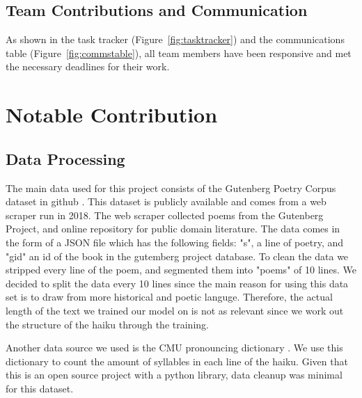 \documentclass{article} %
\begin{document}
\subsection{Team Contributions and Communication}

As shown in the task tracker (Figure~\ref{fig:tasktracker}) and the communications table (Figure~\ref{fig:commstable}), all team members have been responsive and met the necessary deadlines for their work.



\section{Notable Contribution}

\subsection{Data Processing}
The main data used for this project consists of the Gutenberg Poetry Corpus dataset in
github \citep{gutenberg_dataset}.
This dataset is publicly available and comes from a web scraper run in 2018.
The web scraper collected poems from the Gutenberg Project, and online repository for public domain literature.
The data comes in the form of a JSON file which has the following fields:
"s", a line of poetry, and "gid" an id of the book in the gutemberg project database.
To clean the data we stripped every line of the poem, and segmented them into "poems" of 10 lines.
We decided to split the data every 10 lines since the main reason for using this data set is to draw from more historical and poetic languge.
Therefore, the actual length of the text we trained our model on is not as relevant since we work out the structure of the haiku through the training.

Another data source we used is the CMU pronouncing dictionary \citep{cmu_pronouncing_dictionary}.
We use this dictionary to count the amount of syllables in each line of the haiku.
Given that this is an open source project with a python library, data cleanup was minimal for this dataset.
\end{document}
